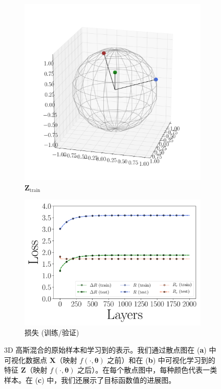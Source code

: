 \documentclass[../../book-main.tex]{subfiles}
\begin{document}
\begin{example}
\begin{figure}[t]
\begin{subfigure}[t]{0.32\textwidth}
        \includegraphics[width=\textwidth]{figs_chap4/scatter3d-Z_train.pdf}\vspace{-0.1in}
        \caption{$\bm{Z}_{\text{train}}$}
    \end{subfigure}
    \hfill
    \begin{subfigure}[t]{0.32\textwidth}
        \centering
        \includegraphics[width=\textwidth]{figs_chap4/scatter3d-loss-traintest.pdf}\vspace{-0.1in}
        \caption{损失 (训练/验证)}
    \end{subfigure}
    \vspace{-0.1in}
    \caption{\small 3D 高斯混合的原始样本和学习到的表示。我们通过散点图在 (\textbf{a}) 中可视化数据点 $\bm{X}$（映射 $f(\cdot, \bm{\theta})$ 之前）和在 (\textbf{b}) 中可视化学习到的特征 $\bm{Z}$（映射 $f(\cdot, \bm{\theta})$ 之后）。在每个散点图中，每种颜色代表一类样本。在 (\textbf{c}) 中，我们还展示了目标函数值的进展图。}
    \label{fig:redu-3d-gaussian-diagram}
\end{figure}

\end{example}
\end{document}
